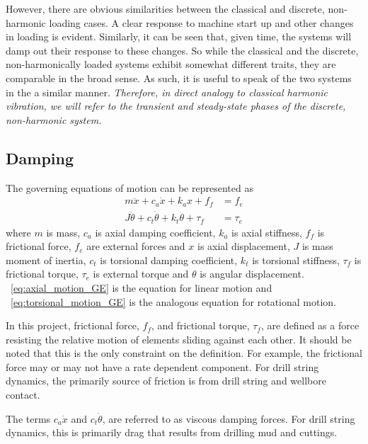 However, there are obvious similarities between the classical and discrete, non-harmonic loading cases.  A clear response to machine start up and other changes in loading is evident.  Similarly, it can be seen that, given time, the systems will damp out their response to these changes. So while the classical and the discrete, non-harmonically loaded systems exhibit somewhat different traits, they are comparable in the broad sense.  As such, it is useful to speak of the two systems in the a similar manner.  \emph{Therefore, in direct analogy to classical harmonic vibration, we will refer to the transient and steady-state phases of the discrete, non-harmonic system.}

\subsection{Damping}
\label{sec:damping}
The governing equations of motion can be represented as
\begin{align}
    m\ddot{x}      + c_a\dot{x}      + k_ax      + f_f    & = f_e    \label{eq:axial_motion_GE} \\
    J\ddot{\theta} + c_t\dot{\theta} + k_t\theta + \tau_f & = \tau_e \label{eq:torsional_motion_GE}
\end{align}
where $m$ is mass, $c_a$ is axial damping coefficient, $k_a$ is axial stiffness, $f_f$ is frictional force, $f_e$ are external forces and $x$ is axial displacement, $J$ is mass moment of inertia, $c_t$ is torsional damping coefficient, $k_t$ is torsional stiffness, $\tau_f$ is frictional torque, $\tau_e$ is external torque and $\theta$ is angular displacement.  \equationname~\ref{eq:axial_motion_GE} is the equation for linear motion and \equationname~\ref{eq:torsional_motion_GE} is the analogous equation for rotational motion.

In this project, frictional force, $f_f$, and frictional torque, $\tau_f$, are defined as a force resisting the relative motion of elements sliding against each other.  It should be noted that this is the only constraint on the definition.  For example, the frictional force may or may not have a rate dependent component.  For drill string dynamics, the primarily source of friction is from drill string and wellbore contact.


The terms $c_a\dot{x}$ and $c_t\dot{\theta}$, are referred to as viscous damping forces.  For drill string dynamics, this is primarily drag that results from drilling mud and cuttings.

